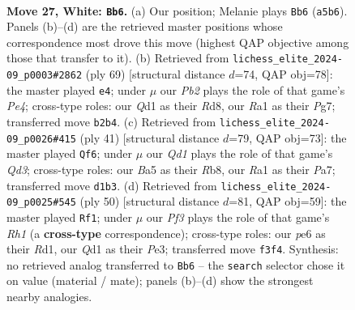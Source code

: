 \documentclass[11pt]{article}
\begin{document}
\clearpage

\begin{figure}[p]\centering
\begin{subfigure}{0.46\textwidth}\centering
\resizebox{\linewidth}{!}{%
\newchessgame
\chessboard[
  setfen={1Nr5/rp2bpk1/p3p3/B3q3/7p/4PP2/PP4PP/R2QR1K1 w - - 1 27},
  showmover=false,
  pgfstyle=straightmove, color=movearrow, markmove={a5-b6}
]}
\caption{}
\end{subfigure}\hfill
\begin{subfigure}{0.46\textwidth}\centering
\resizebox{\linewidth}{!}{%
\newchessgame
\chessboard[
  setfen={3r2k1/2q1rpp1/7p/1BP1p3/2Qp4/1Pn4P/5PP1/2R1R1K1 b - - 11 35},
  showmover=false,
  pgfstyle=straightmove, color=movearrow, markmove={e5-e4}
]}
\caption{}
\end{subfigure}
\\[4pt]
\begin{subfigure}{0.46\textwidth}\centering
\resizebox{\linewidth}{!}{%
\newchessgame
\chessboard[
  setfen={1r2r1k1/p4pp1/2pq3p/3p4/4n1Q1/6P1/PPR1PPBP/3R2K1 b - - 2 21},
  showmover=false,
  pgfstyle=straightmove, color=movearrow, markmove={d6-f6}
]}
\caption{}
\end{subfigure}\hfill
\begin{subfigure}{0.46\textwidth}\centering
\resizebox{\linewidth}{!}{%
\newchessgame
\chessboard[
  setfen={r3k3/1p3p2/4qB1r/bp2P2p/1pP5/4P2P/P2Q2P1/3RK2R w q - 1 26},
  showmover=false,
  pgfstyle=straightmove, color=movearrow, markmove={h1-f1}
]}
\caption{}
\end{subfigure}
\caption{\textbf{Move 27, White: \texttt{Bb6}.} (a) Our position; Melanie plays \texttt{Bb6} (\texttt{a5b6}). Panels (b)--(d) are the retrieved master positions whose correspondence most drove this move (highest QAP objective among those that transfer to it). (b) Retrieved from \texttt{lichess\_elite\_2024-09\_p0003\#2862} (ply 69) [structural distance $d$=74, QAP obj=78]: the master played \texttt{e4}; under $\mu$ our \emph{Pb2} plays the role of that game's \emph{Pe4}; cross-type roles: our \emph{Q}d1 as their \emph{R}d8, our \emph{R}a1 as their \emph{P}g7; transferred move \texttt{b2b4}. (c) Retrieved from \texttt{lichess\_elite\_2024-09\_p0026\#415} (ply 41) [structural distance $d$=79, QAP obj=73]: the master played \texttt{Qf6}; under $\mu$ our \emph{Qd1} plays the role of that game's \emph{Qd3}; cross-type roles: our \emph{B}a5 as their \emph{R}b8, our \emph{R}a1 as their \emph{P}a7; transferred move \texttt{d1b3}. (d) Retrieved from \texttt{lichess\_elite\_2024-09\_p0025\#545} (ply 50) [structural distance $d$=81, QAP obj=59]: the master played \texttt{Rf1}; under $\mu$ our \emph{Pf3} plays the role of that game's \emph{Rh1} (a \textbf{cross-type} correspondence); cross-type roles: our \emph{p}e6 as their \emph{R}d1, our \emph{Q}d1 as their \emph{P}e3; transferred move \texttt{f3f4}. Synthesis: no retrieved analog transferred to \texttt{Bb6} -- the \texttt{search} selector chose it on value (material / mate); panels (b)--(d) show the strongest nearby analogies.}
\label{fig:thought-m52}
\end{figure}
\end{document}
